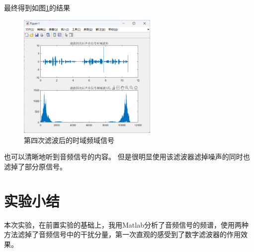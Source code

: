 \documentclass[UTF8]{ctexart}
\begin{document}
最终得到如图\ref{img:6}的结果
\begin{figure}[htbp]
    \centering
    \includegraphics[width=0.6\textwidth]{6.png}
    \caption{第四次滤波后的时域频域信号}
    \label{img:6}
\end{figure}
也可以清晰地听到音频信号的内容。
但是很明显使用该滤波器滤掉噪声的同时也滤掉了部分原信号。
\section{实验小结}
本次实验，在前置实验的基础上，我用Matlab分析了音频信号的频谱，使用两种方法滤掉了音频信号中的干扰分量，第一次直观的感受到了数字滤波器的作用效果。
\end{document}
